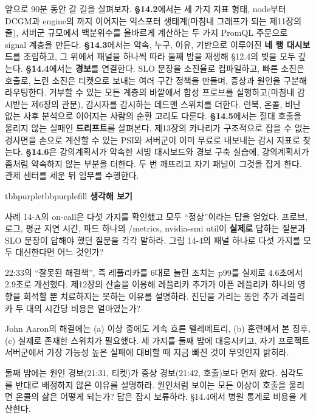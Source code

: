 앞으로 90분 동안 갈 길을 살펴보자. \textbf{§14.2}에서는 세 가지 지표 형태, node부터 DCGM과 engine의 까지 이어지는 익스포터 생태계(마침내 그래프가 되는 제11장의 줄), 서버군 규모에서 백분위수를 올바르게 계산하는 두 가지 PromQL 주문으로 signal 계층을 만든다. \textbf{§14.3}에서는 약속, 누구, 이유, 기반으로 이루어진 \textbf{네 행 대시보드}를 조립하고, 그 위에서 패널을 하나씩 따라 둘째 밤을 재생해 §12.4의 빚을 모두 갚는다. \textbf{§14.4}에서는 \textbf{경보}를 연결한다. SLO 문장을 소진율로 컴파일하고, 빠른 소진은 호출로, 느린 소진은 티켓으로 보내는 여러 구간 정책을 만들며, 증상과 원인을 구분해 라우팅한다. 거부할 수 있는 모든 계층의 바깥에서 합성 프로브를 실행하고(마침내 감시받는 제6장의 관문), 감시자를 감시하는 데드맨 스위치를 더한다. 런북, 온콜, 비난 없는 사후 분석으로 이어지는 사람의 순환 고리도 다룬다. \textbf{§14.5}에서는 절대 호출을 울리지 않는 실패인 \textbf{드리프트}를 살펴본다. 제13장의 카나리가 구조적으로 잡을 수 없는 경사면을 손으로 계산할 수 있는 PSI와 서버군이 이미 무료로 내보내는 감시 지표로 찾는다. \textbf{§14.6}은 강의계획서가 약속한 서빙 대시보드와 경보 구축 실습에, 강의계획서가 좀처럼 약속하지 않는 부분을 더한다. 두 번 깨뜨리고 자기 패널이 그것을 잡게 한다. 관제 센터를 세운 뒤 임무를 수행한다.

\begin{calloutbox}{tbbpurple}{tbbpurplefill}
{\normalsize\bfseries\color{tbbpurple}생각해 보기}\par\vspace{3pt}
\begin{tbbitemize}
  \item 사례 14-A의 on-call은 다섯 가지를 확인했고 모두 “정상”이라는 답을 얻었다. 프로브, 로그, 평균 지연 시간, 파드 하나의 /metrics, nvidia-smi util이 \textbf{실제로} 답하는 질문과 SLO 문장이 답해야 했던 질문을 각각 말하라. 그림 14-4의 패널 하나로 다섯 가지를 모두 대신한다면 어느 것인가?
  \item 22:33의 “잘못된 해결책”, 즉 레플리카를 6대로 늘린 조치는 p99를 실제로 4.6초에서 2.9초로 개선했다. 제12장의 산술을 이용해 레플리카 추가가 아픈 레플리카 하나의 영향을 희석할 뿐 치료하지는 못하는 이유를 설명하라. 진단을 가리는 동안 추가 레플리카 두 대의 시간당 비용은 얼마였는가?
  \item John Aaron의 해결에는 (a) 이상 중에도 계속 흐른 텔레메트리, (b) 훈련에서 본 징후, (c) 실제로 존재한 스위치가 필요했다. 세 가지를 둘째 밤에 대응시키고, 자기 프로젝트 서버군에서 가장 가능성 높은 실패에 대비할 때 지금 빠진 것이 무엇인지 밝히라.
  \item 둘째 밤에는 원인 경보(21:31, 티켓)가 증상 경보(21:42, 호출)보다 먼저 왔다. 심각도를 반대로 배정하지 않은 이유를 설명하라. 원인처럼 보이는 모든 이상이 호출을 울리면 온콜의 삶은 어떻게 되는가? 답은 잠시 보류하라. §14.4에서 병원 통계로 비용을 계산한다.
\end{tbbitemize}
\end{calloutbox}

